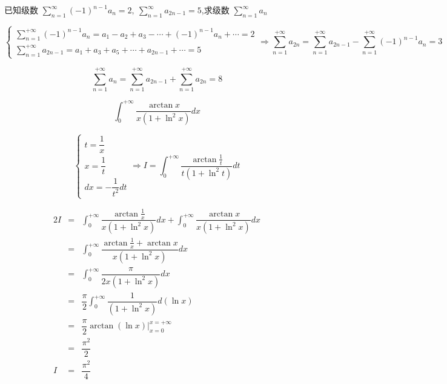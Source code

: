 \begin{example}[][Exam: 29.4.10]
	已知级数 $\sum\limits_{n=1}^{\infty}(-1)^{n-1}a_{n}=2,\ \sum\limits_{n=1}^{\infty}a_{2n-1}=5$,求级数 $\sum\limits_{n=1}^{\infty}a_{n}$
\end{example}
\begin{solution}
	
	$$\begin{cases}
	  \sum\limits_{n=1}^{+\infty}(-1)^{n-1}a_{n}  =  a_{1} - a_{2} + a_{3} - \cdots + (-1)^{n-1}a_{n} + \cdots = 2\\
	  \sum\limits_{n=1}^{+\infty}a_{2n-1} =   a_{1} + a_{3} + a_{5} + \cdots + a_{2n-1} + \cdots = 5
	\end{cases}\Rightarrow
	\sum\limits_{n=1}^{+\infty}a_{2n} = \sum\limits_{n=1}^{+\infty}a_{2n-1} - \sum\limits_{n=1}^{+\infty}(-1)^{n-1}a_{n} = 3$$

	$$\sum\limits_{n=1}^{+\infty}a_{n} = \sum\limits_{n=1}^{+\infty}a_{2n-1} + \sum\limits_{n=1}^{+\infty}a_{2n} = 8$$
\end{solution}

\begin{example}[][Exam: 29.4.11]
	$$\int_{0}^{+\infty}\dfrac{\arctan x}{x(1+\ln^2 x)}dx$$
\end{example}

\begin{solution}

	$$\begin{cases}
	  t = \dfrac{1}{x}\\
	  x = \dfrac{1}{t}\\
	  dx = -\dfrac{1}{t^{2}}dt
	\end{cases}\Rightarrow I = \int_{0}^{+\infty}\dfrac{\arctan \frac{1}{t}}{t(1+\ln^2 t)}dt$$
	
	\begin{eqnarray*}
		2I & = & \int_{0}^{+\infty}\dfrac{\arctan \frac{1}{x}}{x(1+\ln^2 x)}dx + \int_{0}^{+\infty}\dfrac{\arctan x}{x(1+\ln^2 x)}dx\\
		   & = & \int_{0}^{+\infty}\dfrac{\arctan \frac{1}{x} + \arctan x}{x(1+\ln^2 x)}dx \\
		   & = & \int_{0}^{+\infty}\dfrac{\pi}{2x(1+\ln^2 x)}dx \\
		   & = & \dfrac{\pi}{2}\int_{0}^{+\infty}\dfrac{1}{(1+\ln^2 x)}d(\ln x)\\
		   & = & \dfrac{\pi}{2}\arctan (\ln x)\big|_{x=0}^{x=+\infty}\\
		   & = & \dfrac{\pi^{2}}{2}\\
		I  & = & \dfrac{\pi^2}{4}
	\end{eqnarray*}
\end{solution}

